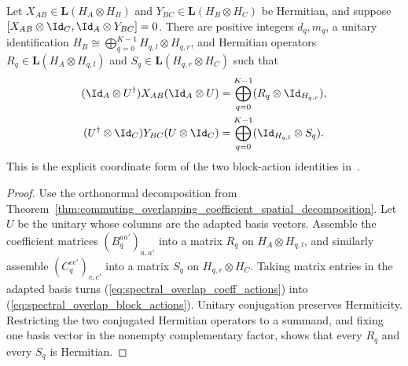 \begin{theorem}%
    \label{thm:commuting_overlapping_unitary_block_actions}
    \leanok
    Let $X_{AB}\in\mathbf L(H_A\otimes H_B)$ and
    $Y_{BC}\in\mathbf L(H_B\otimes H_C)$ be Hermitian, and suppose
    $[X_{AB}\otimes\Id_C,\Id_A\otimes Y_{BC}]=0$. There are positive
    integers $d_q,m_q$, a unitary identification
    $H_B\cong\bigoplus_{q=0}^{K-1}H_{q,l}\otimes H_{q,r}$, and Hermitian
    operators $R_q\in\mathbf L(H_A\otimes H_{q,l})$ and
    $S_q\in\mathbf L(H_{q,r}\otimes H_C)$ such that
    \begin{align}
        (\Id_A\otimes U^\dagger)X_{AB}(\Id_A\otimes U)
         & =\bigoplus_{q=0}^{K-1}
        (R_q\otimes\Id_{H_{q,r}}), \notag \\
        (U^\dagger\otimes\Id_C)Y_{BC}(U\otimes\Id_C)
         & =\bigoplus_{q=0}^{K-1}
        (\Id_{H_{q,l}}\otimes S_q).
        \label{eq:spectral_overlap_block_actions}
    \end{align}
    This is the explicit coordinate form of the two block-action identities
    in~\cite[Lemma~2.1]{Beigi2012Classification}.
\end{theorem}

\begin{proof}
    \leanok
    Use the orthonormal decomposition from
    Theorem~\ref{thm:commuting_overlapping_coefficient_spatial_decomposition}.
    Let $U$ be the unitary whose columns are the adapted basis vectors.
    Assemble the coefficient matrices $(B_q^{aa'})_{a,a'}$ into a matrix
    $R_q$ on $H_A\otimes H_{q,l}$, and similarly assemble
    $(C_q^{cc'})_{c,c'}$ into a matrix $S_q$ on
    $H_{q,r}\otimes H_C$. Taking matrix entries in the adapted basis turns
    (\ref{eq:spectral_overlap_coeff_actions}) into
    (\ref{eq:spectral_overlap_block_actions}). Unitary conjugation preserves
    Hermiticity. Restricting the two conjugated Hermitian operators to a
    summand, and fixing one basis vector in the nonempty complementary
    factor, shows that every $R_q$ and every $S_q$ is Hermitian.
\end{proof}

